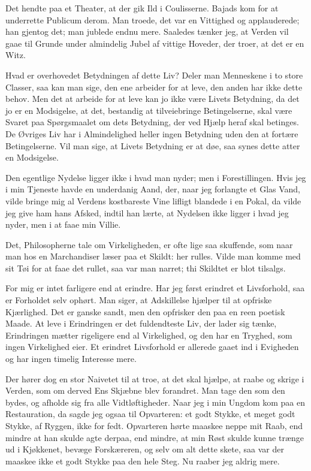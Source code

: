 \documentclass[12pt,a4paper]{article}
\begin{document}
Det hendte paa et Theater, at der gik Ild i Coulisserne. Bajads kom for at underrette Publicum derom. Man troede, det var en Vittighed og applauderede; han gjentog det; man jublede endnu mere. Saaledes tænker jeg, at Verden vil gaae til Grunde under almindelig Jubel af vittige Hoveder, der troer, at det er en Witz.

Hvad er overhovedet Betydningen af dette Liv? Deler man Menneskene i to store Classer, saa kan man sige, den ene arbeider for at leve, den anden har ikke dette behov. Men det at arbeide for at leve kan jo ikke være Livets Betydning, da det jo er en Modsigelse, at det, bestandig at tilveiebringe Betingelserne, skal være Svaret paa Spørgsmaalet om dets Betydning, der ved Hjælp heraf skal betinges. De Øvriges Liv har i Almindelighed heller ingen Betydning uden den at fortære Betingelserne. Vil man sige, at Livets Betydning er at døe, saa synes dette atter en Modsigelse.

Den egentlige Nydelse ligger ikke i hvad man nyder; men i Forestillingen. Hvis jeg i min Tjeneste havde en underdanig Aand, der, naar jeg forlangte et Glas Vand, vilde bringe mig al Verdens kostbareste Vine lifligt blandede i en Pokal, da vilde jeg give ham hans Afsked, indtil han lærte, at Nydelsen ikke ligger i hvad jeg nyder, men i at faae min Villie.

Det, Philosopherne tale om Virkeligheden, er ofte lige saa skuffende, som naar man hos en Marchandiser læser paa et Skildt: her rulles. Vilde man komme med sit Tøi for at faae det rullet, saa var man narret; thi Skildtet er blot tilsalgs.

For mig er intet farligere end at erindre. Har jeg først erindret et Livsforhold, saa er Forholdet selv ophørt. Man siger, at Adskillelse hjælper til at opfriske Kjærlighed. Det er ganske sandt, men den opfrisker den paa en reen poetisk Maade. At leve i Erindringen er det fuldendteste Liv, der lader sig tænke, Erindringen mætter rigeligere end al Virkelighed, og den har en Tryghed, som ingen Virkelighed eier. Et erindret Livsforhold er allerede gaaet ind i Evigheden og har ingen timelig Interesse mere.

Der hører dog en stor Naivetet til at troe, at det skal hjælpe, at raabe og skrige i Verden, som om derved Ens Skjæbne blev forandret. Man tage den som den bydes, og afholde sig fra alle Vidtløftigheder. Naar jeg i min Ungdom kom paa en Restauration, da sagde jeg ogsaa til Opvarteren: et godt Stykke, et meget godt Stykke, af Ryggen, ikke for fedt. Opvarteren hørte maaskee neppe mit Raab, end mindre at han skulde agte derpaa, end mindre, at min Røst skulde kunne trænge ud i Kjøkkenet, bevæge Forskæreren, og selv om alt dette skete, saa var der maaskee ikke et godt Stykke paa den hele Steg. Nu raaber jeg aldrig mere.
\end{document}
